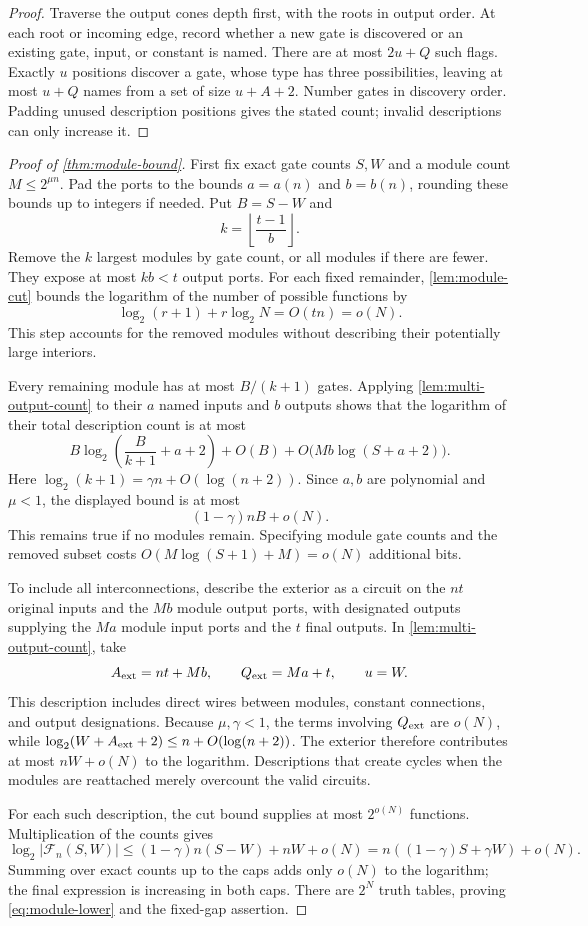 \documentclass[11pt]{article}
\begin{document}
\begin{proof}
Traverse the output cones depth first, with the roots in output order.
At each root or incoming edge, record whether a new gate is discovered
or an existing gate, input, or constant is named.  There are at most
$2u+Q$ such flags.  Exactly $u$ positions discover a gate, whose type
has three possibilities, leaving at most $u+Q$ names from a set of
size $u+A+2$.  Number gates in discovery order.  Padding unused
description positions gives the stated count; invalid descriptions
can only increase it.
\end{proof}

\begin{proof}[Proof of \cref{thm:module-bound}]
First fix exact gate counts $S,W$ and a module count $M\le2^{\mu n}$.
Pad the ports to the bounds $a=a(n)$ and $b=b(n)$, rounding these
bounds up to integers if needed.  Put $B=S-W$ and
\[
 k=\left\lfloor\frac{t-1}{b}\right\rfloor.
\]
Remove the $k$ largest modules by gate count, or all modules if there
are fewer.  They expose at most $kb<t$ output ports.  For each fixed
remainder, \cref{lem:module-cut} bounds the logarithm of the number of
possible functions by
\[
 \log_2(r+1)+r\log_2N=O(tn)=o(N).
\]
This step accounts for the removed modules without describing their
potentially large interiors.

Every remaining module has at most $B/(k+1)$ gates.  Applying
\cref{lem:multi-output-count} to their $a$ named inputs and $b$ outputs
shows that the logarithm of their total description count is at most
\[
 B\log_2\!\left(\frac{B}{k+1}+a+2\right)
 +O(B)+O\bigl(Mb\log(S+a+2)\bigr).
\]
Here $\log_2(k+1)=\gamma n+O(\log(n+2))$.  Since $a,b$ are polynomial
and $\mu<1$, the displayed bound is at most
\[
 (1-\gamma)nB+o(N).
\]
This remains true if no modules remain.  Specifying module gate counts
and the removed subset costs $O(M\log(S+1)+M)=o(N)$ additional bits.

To include all interconnections, describe the exterior as a circuit
on the $nt$ original inputs and the $Mb$ module output ports, with
designated outputs supplying the $Ma$ module input ports and the $t$
final outputs.  In \cref{lem:multi-output-count}, take
\[
 A_{\rm ext}=nt+Mb,\qquad Q_{\rm ext}=Ma+t,\qquad u=W.
\]
This description includes direct wires between modules, constant
connections, and output designations.  Because $\mu,\gamma<1$,
the terms involving $Q_{\rm ext}$ are $o(N)$, while
$\log_2(W+A_{\rm ext}+2)\le n+O(\log(n+2))$.  The exterior therefore
contributes at most $nW+o(N)$ to the logarithm.  Descriptions that create cycles
when the modules are reattached merely overcount the valid circuits.

For each such description, the cut bound supplies at most $2^{o(N)}$
functions.  Multiplication of the counts gives
\[
 \log_2|\mathcal F_n(S,W)|
 \le (1-\gamma)n(S-W)+nW+o(N)
 =n((1-\gamma)S+\gamma W)+o(N).
\]
Summing over exact counts up to the caps adds only $o(N)$ to the
logarithm; the final expression is increasing in both caps.
There are $2^N$ truth tables, proving \eqref{eq:module-lower} and the
fixed-gap assertion.
\end{proof}
\end{document}
